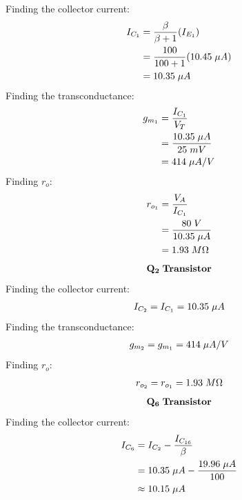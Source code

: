 \documentclass{article}
\begin{document}
	Finding the collector current:
	\begin{align*}
		I_{C_{1}} &= \frac{\beta}{\beta + 1} (I_{E_1})\\
		&= \frac{100}{100 + 1} (10.45 \hspace{1mm} \mu A)\\
		&= 10.35 \hspace{1mm} \mu A
	\end{align*}
	Finding the transconductance:
	\begin{align*}
		g_{m_{1}} &= \frac{I_{C_{1}}}{V_T}\\
		&= \frac{10.35 \hspace{1mm} \mu A}{25 \hspace{1mm} mV}\\
		&= 414 \hspace{1mm} \mu A/V
	\end{align*}
	Finding $r_o$:
	\begin{align*}
		r_{o_{1}} &= \frac{V_A}{I_{C_{1}}}\\
		&= \frac{80 \hspace{1mm} V}{10.35 \hspace{1mm} \mu A}\\
		&= 1.93 \hspace{1mm} M\Omega
	\end{align*}
	\begin{align*}
		\mathbf{Q_{2}} \hspace{1mm} \textbf{Transistor}
	\end{align*}
	Finding the collector current:
	\begin{align*}
		I_{C_2} = I_{C_1} = 10.35 \hspace{1mm} \mu A
	\end{align*}
	Finding the transconductance:
	\begin{align*}
		g_{m_2} = g_{m_1} = 414 \hspace{1mm} \mu A/V
	\end{align*}
	Finding $r_o$:
	\begin{align*}
		r_{o_2} = r_{o_1} = 1.93 \hspace{1mm} M\Omega 
	\end{align*}
	\begin{align*}
		\mathbf{Q_6} \hspace{1mm} \textbf{Transistor}
	\end{align*}
	Finding the collector current:
	\begin{align*}
		I_{C_{6}} &= I_{C_2} - \frac{I_{C_{16}}}{\beta}\\
		&= 10.35 \hspace{1mm} \mu A - \frac{19.96 \hspace{1mm} \mu A}{100}\\
		&\approx 10.15 \hspace{1mm} \mu A
	\end{align*}
\end{document}
